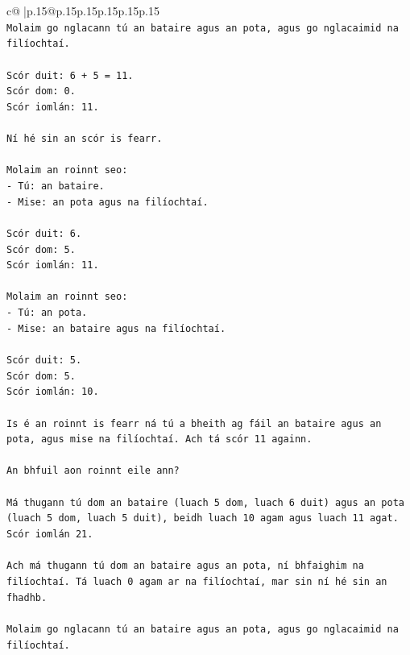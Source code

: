 \documentclass{article}
\begin{document}
{\begin{supertabular}{c@{$\;$}|p{.15\linewidth}@{}p{.15\linewidth}p{.15\linewidth}p{.15\linewidth}p{.15\linewidth}p{.15\linewidth}}
{{{\\ 
\texttt{Molaim go nglacann tú an bataire agus an pota, agus go nglacaimid na filíochtaí.} \\
\\ 
\texttt{Scór duit: 6 + 5 = 11.} \\
\texttt{Scór dom: 0.} \\
\texttt{Scór iomlán: 11.} \\
\\ 
\texttt{Ní hé sin an scór is fearr.} \\
\\ 
\texttt{Molaim an roinnt seo:} \\
\texttt{{-} Tú: an bataire.} \\
\texttt{{-} Mise: an pota agus na filíochtaí.} \\
\\ 
\texttt{Scór duit: 6.} \\
\texttt{Scór dom: 5.} \\
\texttt{Scór iomlán: 11.} \\
\\ 
\texttt{Molaim an roinnt seo:} \\
\texttt{{-} Tú: an pota.} \\
\texttt{{-} Mise: an bataire agus na filíochtaí.} \\
\\ 
\texttt{Scór duit: 5.} \\
\texttt{Scór dom: 5.} \\
\texttt{Scór iomlán: 10.} \\
\\ 
\texttt{Is é an roinnt is fearr ná tú a bheith ag fáil an bataire agus an pota, agus mise na filíochtaí. Ach tá scór 11 againn.} \\
\\ 
\texttt{An bhfuil aon roinnt eile ann?} \\
\\ 
\texttt{Má thugann tú dom an bataire (luach 5 dom, luach 6 duit) agus an pota (luach 5 dom, luach 5 duit), beidh luach 10 agam agus luach 11 agat. Scór iomlán 21.} \\
\\ 
\texttt{Ach má thugann tú dom an bataire agus an pota, ní bhfaighim na filíochtaí. Tá luach 0 agam ar na filíochtaí, mar sin ní hé sin an fhadhb.} \\
\\ 
\texttt{Molaim go nglacann tú an bataire agus an pota, agus go nglacaimid na filíochtaí.} \\
}}}
\end{supertabular}}
\end{document}
